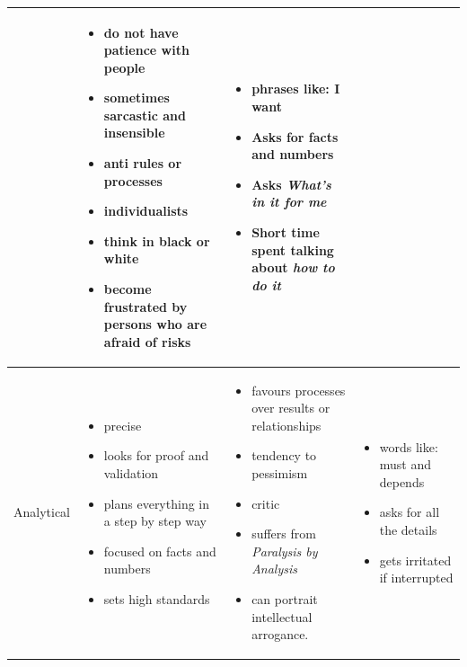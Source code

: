 \begin{table}[h]
\begin{tabular}{p{}p{}p{}p{}}
\begin{itemize}
      \end{itemize}
     &
      \begin{itemize}
       \item do not have patience with people
       \item sometimes sarcastic and insensible
       \item anti rules or processes
       \item individualists
       \item think in black or white
       \item become frustrated by persons who are afraid of risks
      \end{itemize}
     & 
     \begin{itemize}
      \item phrases like: I want
      \item Asks for facts and numbers
      \item Asks \textit {What's in it for me}
      \item Short time spent talking about \textit {how to do it}
     \end{itemize}
     \\ \midrule
    Analytical
     &
      \begin{itemize}
       \item precise
       \item looks for proof and validation
       \item plans everything in a step by step way
       \item focused on facts and numbers
       \item sets high standards
      \end{itemize}
     &
      \begin{itemize}
       \item favours processes over results or relationships
       \item tendency to pessimism
       \item critic
       \item suffers from \textit{Paralysis by Analysis}
       \item can portrait intellectual arrogance.
      \end{itemize}
     &
      \begin{itemize}
       \item words like: must and depends
       \item asks for all the details
       \item gets irritated if interrupted

\end{itemize}
\end{tabular}
\end{table}
